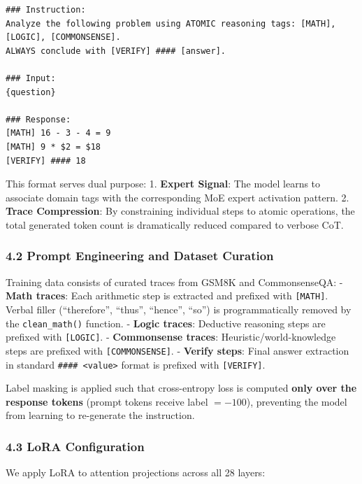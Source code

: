 \begin{verbatim}
### Instruction:
Analyze the following problem using ATOMIC reasoning tags: [MATH], [LOGIC], [COMMONSENSE].
ALWAYS conclude with [VERIFY] #### [answer].

### Input:
{question}

### Response:
[MATH] 16 - 3 - 4 = 9
[MATH] 9 * $2 = $18
[VERIFY] #### 18
\end{verbatim}

This format serves dual purpose: 1. \textbf{Expert Signal}: The model
learns to associate domain tags with the corresponding MoE expert
activation pattern. 2. \textbf{Trace Compression}: By constraining
individual steps to atomic operations, the total generated token count
is dramatically reduced compared to verbose CoT.

\subsubsection{4.2 Prompt Engineering and Dataset
Curation}\label{prompt-engineering-and-dataset-curation}

Training data consists of curated traces from GSM8K and CommonsenseQA: -
\textbf{Math traces}: Each arithmetic step is extracted and prefixed
with \texttt{{[}MATH{]}}. Verbal filler (``therefore'', ``thus'',
``hence'', ``so'') is programmatically removed by the
\texttt{clean\_math()} function. - \textbf{Logic traces}: Deductive
reasoning steps are prefixed with \texttt{{[}LOGIC{]}}. -
\textbf{Commonsense traces}: Heuristic/world-knowledge steps are
prefixed with \texttt{{[}COMMONSENSE{]}}. - \textbf{Verify steps}: Final
answer extraction in standard
\texttt{\#\#\#\#\ \textless{}value\textgreater{}} format is prefixed
with \texttt{{[}VERIFY{]}}.

Label masking is applied such that cross-entropy loss is computed
\textbf{only over the response tokens} (prompt tokens receive label
\(= -100\)), preventing the model from learning to re-generate the
instruction.

\subsubsection{4.3 LoRA Configuration}\label{lora-configuration}

We apply LoRA to attention projections across all 28 layers:

